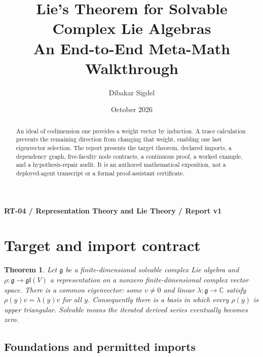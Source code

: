 \documentclass[preprint,12pt,aps,pra,showkeys,amsmath,amssymb,superscriptaddress,floatfix]{revtex4-2}
\newtheorem{theorem}{Theorem}[section]
\theoremstyle{definition}
\theoremstyle{remark}
\begin{document}
\title{Lie's Theorem for Solvable Complex Lie Algebras\\[4pt]\large An End-to-End Meta-Math Walkthrough}

\author{Dibakar Sigdel}


\date{October 2026}

\begin{abstract}

An ideal of codimension one provides a weight vector by induction. A
trace calculation prevents the remaining direction from changing that
weight, enabling one last eigenvector selection. The report presents the
target theorem, declared imports, a dependency graph, five-faculty node
contracts, a continuous proof, a worked example, and a hypothesis-repair
audit. It is an authored mathematical exposition, not a deployed-agent
transcript or a formal proof-assistant certificate.

\end{abstract}\maketitle\linespread{1.12}\selectfont

\noindent\textbf{RT-04 / Representation Theory and Lie Theory / Report v1}

\section{Target and import contract}

\begin{theorem}

Let \(\mathfrak g\) be a finite-dimensional solvable complex Lie algebra
and \(\rho:\mathfrak g\to\mathfrak{gl}(V)\) a representation on a
nonzero finite-dimensional complex vector space. There is a common
eigenvector: some \(v\ne0\) and linear
\(\lambda:\mathfrak g\to\mathbb C\) satisfy \(\rho(y)v=\lambda(y)v\) for
all \(y\). Consequently there is a basis in which every \(\rho(y)\) is
upper triangular. Solvable means the iterated derived series eventually
becomes zero.

\end{theorem}

\subsection{Foundations and permitted imports}
\end{document}
